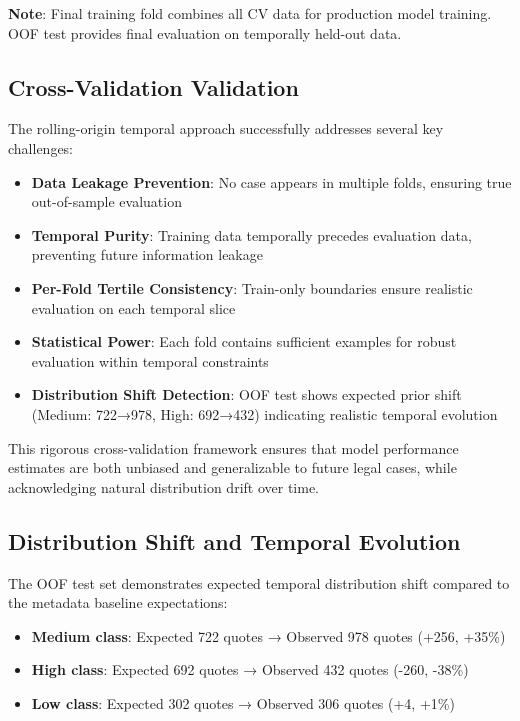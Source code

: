 \documentclass[11pt]{article}
\begin{document}
\textbf{Note}: Final training fold combines all CV data for production model training. OOF test provides final evaluation on temporally held-out data.

\subsection{Cross-Validation Validation}

The rolling-origin temporal approach successfully addresses several key challenges:

\begin{itemize}
\item \textbf{Data Leakage Prevention}: No case appears in multiple folds, ensuring true out-of-sample evaluation
\item \textbf{Temporal Purity}: Training data temporally precedes evaluation data, preventing future information leakage
\item \textbf{Per-Fold Tertile Consistency}: Train-only boundaries ensure realistic evaluation on each temporal slice
\item \textbf{Statistical Power}: Each fold contains sufficient examples for robust evaluation within temporal constraints
\item \textbf{Distribution Shift Detection}: OOF test shows expected prior shift (Medium: 722→978, High: 692→432) indicating realistic temporal evolution
\end{itemize}

This rigorous cross-validation framework ensures that model performance estimates are both unbiased and generalizable to future legal cases, while acknowledging natural distribution drift over time.

\subsection{Distribution Shift and Temporal Evolution}

The OOF test set demonstrates expected temporal distribution shift compared to the metadata baseline expectations:
\begin{itemize}
\item \textbf{Medium class}: Expected 722 quotes → Observed 978 quotes (+256, +35\%)
\item \textbf{High class}: Expected 692 quotes → Observed 432 quotes (-260, -38\%)
\item \textbf{Low class}: Expected 302 quotes → Observed 306 quotes (+4, +1\%)
\end{itemize}
\end{document}
